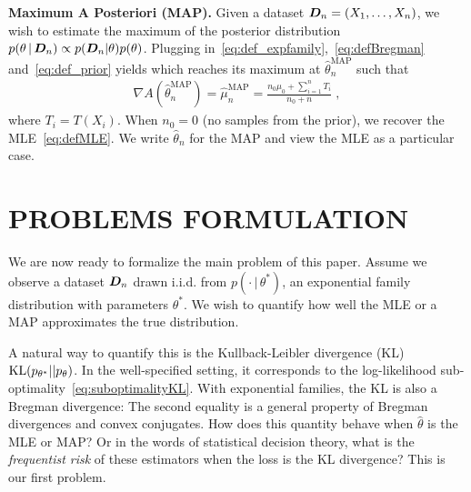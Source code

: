 \documentclass[twoside]{article}
\newcommand{\cond}{\,\vert\,}
\newcommand{\logpart}{A}
\newcommand{\bregman}{\cB_\logpart}
\newcommand{\bregmanconj}{\cB_{\logpart^*}}
\newcommand{\nat}{\theta}
\newcommand{\m}{\mu}
\newcommand{\meanp}{\m}
\newcommand{\MAPm}{\hat \m_n}
\newcommand{\MAPt}{\hat \nat_n}
\begin{document}
{\bf Maximum A Posteriori (MAP).}
Given a dataset ${\bm{D}}_n =(X_1,\dots,X_n)$, we wish to estimate the maximum of the posterior distribution $p(\nat \cond \mD_n) \propto p(\mD_n|\nat)p(\nat)$.
Plugging in~\eqref{eq:def_expfamily},~\eqref{eq:defBregman} and~\eqref{eq:def_prior} yields
\aligns{
	p(\nat \cond \mD_n)
    \propto \exp(- (n_0+n) \bregman(\nat; \MAPt^\text{MAP}))
}
which reaches its maximum at $\MAPt^\text{MAP}$ such that
\begin{align}
    \nabla \logpart(\MAPt^\text{MAP}) = \MAPm^\text{MAP}
    = \frac{n_0 \meanp_0 + \sum_{i=1}^n T_i}{n_0+n} \; ,
    \label{eq:defMAP}
\end{align}
where $T_i=T(X_i)$.
When $n_0=0$ (no samples from the prior), we recover the MLE~\eqref{eq:defMLE}.
We write $\MAPt$ for the MAP and view the MLE as a particular case.


\section{PROBLEMS FORMULATION}
\label{sec:problem}

We are now ready to formalize the main problem of this paper. Assume we observe a dataset ${\bm{D}}_n$ drawn i.i.d. from $p(\cdot \cond\nat^*)$, an exponential family distribution
with parameters $\nat^*$.
We wish to quantify how well the MLE or a MAP approximates the true distribution.

A natural way to quantify this is the Kullback-Leibler divergence (KL) $\KL(p_{\nat^*} || p_\nat)$. %
In the well-specified setting, it corresponds to the log-likelihood sub-optimality~\eqref{eq:suboptimalityKL}.
With exponential families, the KL is also a Bregman divergence:
\alignn{
	\KL(p_{\nat^*} || p_\nat)
	 = \bregman(\nat ; \nat^*)
	 = \bregmanconj(\m^* ; \m) \; .
}
The second equality is a general property of Bregman divergences and convex conjugates. %
How does this quantity behave when $\hat \nat$ is the MLE or MAP?
 Or in the words of statistical decision theory, what is the \emph{frequentist risk} of these estimators when the loss is the KL divergence?
This is our first problem.
\end{document}
